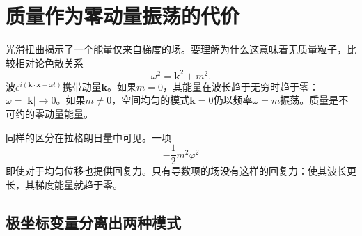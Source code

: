 \begin{classroomqa}
\end{classroomqa}

\begin{classroomqa}
\end{classroomqa}

\begin{classroomqa}
\end{classroomqa}

\section{质量作为零动量振荡的代价}

光滑扭曲揭示了一个能量仅来自梯度的场。要理解为什么这意味着无质量粒子，比较相对论色散关系
\begin{equation}
  \omega^2=\bm{k}^2+m^2.
  \label{eq:l07-dispersion}
\end{equation}
波\(e^{i(\bm{k}\cdot\bm{x}-\omega t)}\)携带动量\(\bm{k}\)。如果\(m=0\)，其能量在波长趋于无穷时趋于零：\(\omega=|\bm{k}|\to0\)。如果\(m\ne0\)，空间均匀的模式\(\bm{k}=0\)仍以频率\(\omega=m\)振荡。质量是不可约的零动量能量。

同样的区分在拉格朗日量中可见。一项
\begin{equation}
  -\frac12m^2\varphi^2
\end{equation}
即使对于均匀位移也提供回复力。只有导数项的场没有这样的回复力：使其波长更长，其梯度能量就趋于零。

\subsection{极坐标变量分离出两种模式}


